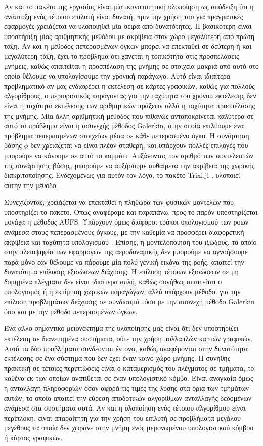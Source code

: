 Αν και το πακέτο της εργασίας είναι μία ικανοποιητική υλοποίηση ως απόδειξη ότι η ανάπτυξη ενός τέτοιου επιλυτή είναι δυνατή, πριν την χρήση του για πραγματικές εφαρμογές χρειάζεται να υλοποιηθεί μία σειρά από δυνατότητες.
Η βασικότερη είναι υποστήριξη μίας αριθμητικής μεθόδου με ακρίβεια στον χώρο μεγαλύτερη από πρώτη τάξη.
Αν και η μέθοδος πεπερασμένων όγκων μπορεί να επεκταθεί σε δεύτερη ή και μεγαλύτερη τάξη, έχει το πρόβλημα ότι χάνεται η τοπικότητα στις προσπελάσεις μνήμεις, καθώς απαιτείται η προσπέλαση της μνήμης σε στοιχεία μακριά από αυτό στο οποίο θέλουμε να υπολογίσουμε την χρονική παράγωγο.
Αυτό είναι ιδιαίτερα προβληματικό αν μας ενδιαφέρει η εκτέλεση σε κάρτες γραφικών, καθώς για πολλούς αλγορίθμους, ο περιοριστικός παράγοντας για την ταχύτητα του χρόνου εκτέλεσης δεν είναι η ταχύτητα εκτέλεσης των αριθμητικών πράξεων αλλά η ταχύτητα προσπέλασης της μνήμης.
Μία άλλη αριθμητική μέθοδος που πιθανώς ανταποκρίνεται καλύτερα σε αυτό το πρόβλημα είναι η ασυνεχής μέθοδος Galerkin, στην οποία επιλύουμε ένα πρόβλημα πεπερασμένων στοιχείων μέσα σε κάθε πεπερασμένο όγκο.
Η συνάρτηση βάσης $\phi$ δεν χρειάζεται να είναι πλέον σταθερή, και υπάρχουν πολλές επιλογές που μπορούμε να κάνουμε σε αυτό το κομμάτι.
Αυξάνοντας τον αριθμό των συντελεστών της συνάρτησης βάσης, μπορούμε να αυξήσουμε αυθαίρετα την ακρίβεια της χωρικής διακριτοποίησης.
Ενδεχομένως για αυτόν τον λόγο, το πακέτο Trixi.jl \cite{Trixi2020}, υλοποιεί αυτήν την μέθοδο.

Συνεχίζοντας, χρειάζεται να επεκταθεί η πληθώρα των φυσικών μοντέλων που υποστηρίζει το πακέτο.
Όπως αναφέραμε και παραπάνω, προς το παρόν υποστηρίζεται μονάχα η μέθοδος AUFS.
Υπάρχουν όμως διάφοροι τρόποι υπολογισμού των ροών ανάμεσα στους πεπερασμένους όγκους, με την καθεμία να προσφέρει διαφορετική ακρίβεια και ταχύτητα υπολογισμού \cite{Toro2012}.
Επίσης, η μοντελοποίηση του ιξώδους, το οποίο στην πλειοψηφία των εφαρμογών της αεροδυναμικής δεν μπορούμε να αγνοήσουμε παρά μόνο εάν θέλουμε να πάρουμε μία πολύ γενική εικόνα της ροής, απαιτεί την δυνατότητα επίλυσης εξισώσεων διάχυσης.
Η επίλυση τέτοιων εξισώσεων σε μη δομημένα πλέγματα δεν είναι ιδιαίτερα απλή, καθώς συνήθως απαιτείται ο υπολογισμός ή η εκτίμηση χωρικών παραγώγων, αλλά υπάρχουν μέθοδοι για την επίλυση προβλημάτων διάχυσης σε συνδιασμό τόσο με την ασυνεχή μέθοδο Galerkin όσο και με την μέθοδο πεπερασμένων όγκων.

Ένα άλλο σημαντικό μειονέκτημα της υλοποίησής μας είναι ότι δεν υποστηρίζει εκτέλεση σε διανεμημένα συστήματα, ούτε την χρήση πολλαπλών καρτών γραφικών.
Αυτά τα δύο προβλήματα συνδέονται έντονα, καθώς αναφέρονται στην δυνατότητα εκτέλεσης σε ένα σύστημα που δεν έχει έναν κοινό χώρο μνήμης.
Η συνήθης πρακτική σε τέτοιες περιπτώσεις είναι ο καταμερισμός του πλέγματος σε τμήματα, το καθένα εκ των οποίων ανατίθεται σε έναν υπολογιστικό κόμβο.
Είναι αναγκαία όμως η ανταλλαγή πληροφοριών όσον αφορά τις τιμές της λύσης στα όρια των τμημάτων αυτών, το οποίο απαιτεί την εύρεση αποδοτικών αλγορίθμων ανταλλαγής δεδομένων ανάμεσα στα συστήματα αυτά.
Αν και η υλοποίηση ενός τέτοιου αλγορίθμου είναι περίπλοκη, είναι απαραίτητη για την χρήση του επιλυτή σε προβλήματα μεγάλου μεγέθους τα οποία δεν χωράνε στην μνήμη ενός μεμονωμένου υπολογιστικού κόμβου ή κάρτας γραφικών.

